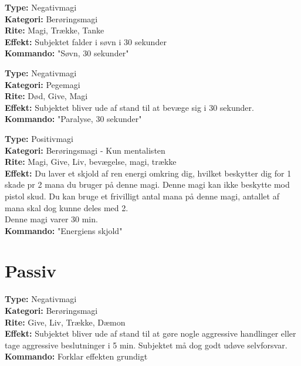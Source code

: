 \begin{defensiv*}[Søvn]
\textbf{Type:} Negativmagi\\
\textbf{Kategori:} Berøringsmagi\\
\textbf{Rite:} Magi, Trække, Tanke\\
\textbf{Effekt:} Subjektet falder i søvn i 30 sekunder\\
\textbf{Kommando:} "Søvn, 30 sekunder"\\
\end{defensiv*}

\begin{defensiv*}[Paralyse]
\textbf{Type:} Negativmagi\\
\textbf{Kategori:} Pegemagi\\
\textbf{Rite:} Død, Give, Magi\\
\textbf{Effekt:} Subjektet bliver ude af stand til at bevæge sig i 30 sekunder.\\
\textbf{Kommando:} "Paralyse, 30 sekunder"\\
\end{defensiv*}

\begin{defensiv*}
\textbf{Type:} Positivmagi\\
\textbf{Kategori:} Berøringsmagi - Kun mentalisten\\
\textbf{Rite:} Magi, Give, Liv, bevægelse, magi, trække\\
\textbf{Effekt:} Du laver et skjold af ren energi omkring dig, hvilket beskytter dig for 1 skade pr 2 mana du bruger på denne magi. Denne magi kan ikke beskytte mod pistol skud. Du kan bruge et frivilligt antal mana på denne magi, antallet af mana skal dog kunne deles med 2.\\
Denne magi varer 30 min.\\
\textbf{Kommando:} "Energiens skjold"
\end{defensiv*}

\section*{Passiv}

\begin{passiv*}
\textbf{Type:} Negativmagi\\
\textbf{Kategori:} Berøringsmagi\\
\textbf{Rite:} Give, Liv, Trække, Dæmon\\
\textbf{Effekt:} Subjektet bliver ude af stand til at gøre nogle aggressive handlinger eller tage aggressive beslutninger i 5 min. Subjektet må dog godt udøve selvforsvar.\\
\textbf{Kommando:} Forklar effekten grundigt
\end{passiv*}

